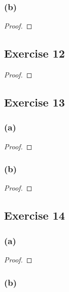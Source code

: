 \documentclass[14pt]{extarticle}
\begin{document}
\subsubsection{(b)}

\begin{proof}

\end{proof}

\subsection{Exercise 12}

\begin{proof}

\end{proof}

\subsection{Exercise 13}

\subsubsection{(a)}

\begin{proof}

\end{proof}

\subsubsection{(b)}

\begin{proof}

\end{proof}

\subsection{Exercise 14}

\subsubsection{(a)}

\begin{proof}

\end{proof}

\subsubsection{(b)}
\end{document}
